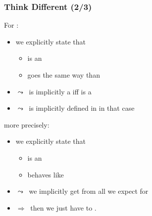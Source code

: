\begin{frame}
  \frametitle{Think Different (2/3)}

For \bfhelloiteratorI:
\medskip
%
\begin{itemize}
\scriptsize
\item we {\color{mediumgreen}explicitly} state that \bfhelloiteratorI
  \begin{itemize} \scriptsize
  \item is an \bfIterator
  \item goes the same way than \bfI
  \end{itemize}
\item $\leadsto ~ $ \bfhelloiteratorI is {\color{mediumgreen}implicitly} a \bfForwardIterator iff \bfI is a \bfForwardIterator
\item $\leadsto ~ $ \bfnext is {\color{mediumgreen}implicitly} defined in \bfarrayiteratorT in that case
\end{itemize}

%
\bigskip
%

more precisely:
\medskip
%
\begin{itemize}
\scriptsize
\item we {\color{mediumgreen}explicitly} state that \bfhelloiteratorI
  \begin{itemize} \scriptsize
  \item is an \bfIterator
  \item behaves like \bfI
  \end{itemize}
\item $\leadsto ~ $ we {\color{mediumgreen}implicitly} get from \bfI all we expect for \bfhelloiteratorI
\item $\Rightarrow ~ $ then we just have to {\color{red}{override}} \bfinit.
\end{itemize}

\end{frame}



